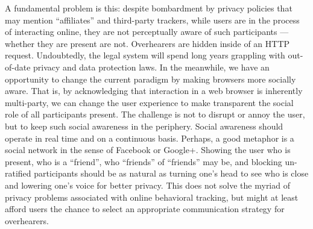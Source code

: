 A fundamental problem is this: despite bombardment by privacy policies that may mention ``affiliates'' and third-party trackers, while users are in the process of interacting online, they are not perceptually aware of such participants --- whether they are present are not. Overhearers are hidden inside of an HTTP request. Undoubtedly, the legal system will spend long years grappling with out-of-date privacy and data protection laws. In the meanwhile, we have an opportunity to change the current paradigm by making browsers more socially aware. That is, by acknowledging that interaction in a web browser is inherently multi-party, we can change the user experience to make transparent the social role of all participants present. The challenge is not to disrupt or annoy the user, but to keep such social awareness in the periphery. Social awareness should operate in real time and on a continuous basis. Perhaps, a good metaphor is a social network in the sense of Facebook or Google+. Showing the user who is present, who is a ``friend'', who ``friends'' of ``friends'' may be, and blocking un-ratified participants should be as natural as turning one's head to see who is close and lowering one's voice for better privacy. This does not solve the myriad of privacy problems associated with online behavioral tracking, but might at least afford users the chance to select an appropriate communication strategy for overhearers.
